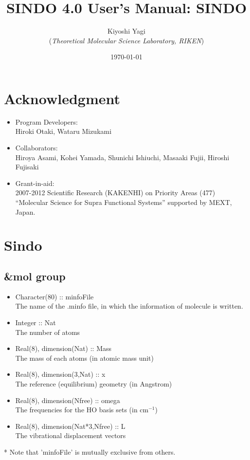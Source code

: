 \documentclass[a4paper,12pt]{article}
\title{{\huge S{\LARGE INDO} 4.0 User's Manual: SINDO} }
\author{Kiyoshi Yagi \\ ({\it Theoretical Molecular Science Laboratory, RIKEN})}
\date{\today}
\begin{document}
\maketitle

\newpage
\tableofcontents

\newpage

\section*{Acknowledgment}

\begin{itemize}
  \item Program Developers: \\
	Hiroki Otaki, Wataru Mizukami

  \item Collaborators: \\
	Hiroya Asami, Kohei Yamada, Shunichi Ishiuchi, Masaaki Fujii, Hiroshi Fujisaki

  \item Grant-in-aid: \\
	2007-2012 Scientific Research (KAKENHI) on Priority Areas (477)  ``Molecular Science for Supra Functional Systems'' supported by MEXT, Japan.	
  
\end{itemize}

\newpage

\section{Sindo}
\subsection{\&mol group}
   \begin{itemize}
     \item Character(80) :: minfoFile \\
       The name of the .minfo file, in which the information of molecule is written.
     \item Integer :: Nat \\
       The number of atoms
     \item Real(8), dimension(Nat) :: Mass \\
       The mass of each atoms (in atomic mass unit)
     \item Real(8), dimension(3,Nat) :: x \\
       The reference (equilibrium) geometry (in Angstrom)
     \item Real(8), dimension(Nfree) :: omega \\
       The frequencies for the HO basis sets (in $\mathrm{cm^{-1}}$) 
     \item Real(8), dimension(Nat*3,Nfree) :: L \\
       The vibrational displacement vectors 
   \end{itemize}
* Note that 'minfoFile' is mutually exclusive from others. 
\end{document}
